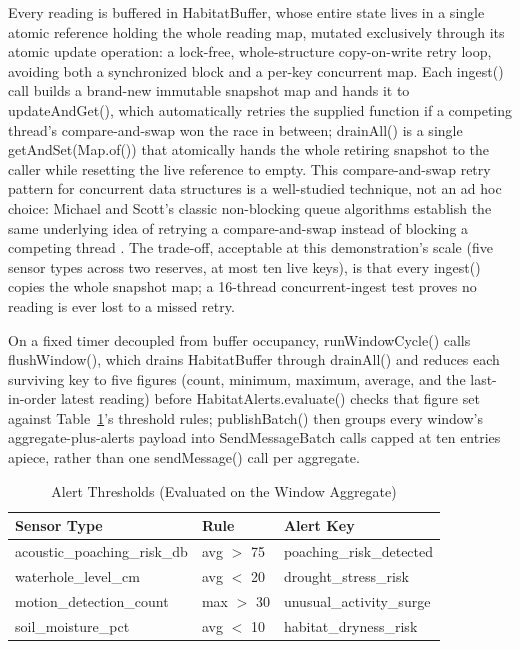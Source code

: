 \documentclass[conference,a4paper]{IEEEtran}
\begin{document}
Every reading is buffered in HabitatBuffer, whose entire state lives in a single atomic reference holding the whole reading map, mutated exclusively through its atomic update operation: a lock-free, whole-structure copy-on-write retry loop, avoiding both a synchronized block and a per-key concurrent map. Each ingest() call builds a brand-new immutable snapshot map and hands it to updateAndGet(), which automatically retries the supplied function if a competing thread's compare-and-swap won the race in between; drainAll() is a single getAndSet(Map.of()) that atomically hands the whole retiring snapshot to the caller while resetting the live reference to empty. This compare-and-swap retry pattern for concurrent data structures is a well-studied technique, not an ad hoc choice: Michael and Scott's classic non-blocking queue algorithms establish the same underlying idea of retrying a compare-and-swap instead of blocking a competing thread \cite{ref4}. The trade-off, acceptable at this demonstration's scale (five sensor types across two reserves, at most ten live keys), is that every ingest() copies the whole snapshot map; a 16-thread concurrent-ingest test proves no reading is ever lost to a missed retry.

On a fixed timer decoupled from buffer occupancy, runWindowCycle() calls flushWindow(), which drains HabitatBuffer through drainAll() and reduces each surviving key to five figures (count, minimum, maximum, average, and the last-in-order latest reading) before HabitatAlerts.evaluate() checks that figure set against Table~\ref{tab:thresholds}'s threshold rules; publishBatch() then groups every window's aggregate-plus-alerts payload into SendMessageBatch calls capped at ten entries apiece, rather than one sendMessage() call per aggregate.

\begin{table}[!t]
\caption{Alert Thresholds (Evaluated on the Window Aggregate)}
\label{tab:thresholds}
\centering\scriptsize
\setlength{\tabcolsep}{2pt}
\begin{tabular}{p{1.46in}p{0.48in}p{1.29in}}
\hline
\textbf{Sensor Type} & \textbf{Rule} & \textbf{Alert Key} \\
\hline
acoustic\_poaching\_risk\_db & avg $>$ 75 & poaching\_risk\_detected \\
waterhole\_level\_cm & avg $<$ 20 & drought\_stress\_risk \\
motion\_detection\_count & max $>$ 30 & unusual\_activity\_surge \\
soil\_moisture\_pct & avg $<$ 10 & habitat\_dryness\_risk \\
\hline
\end{tabular}
\end{table}
\end{document}
